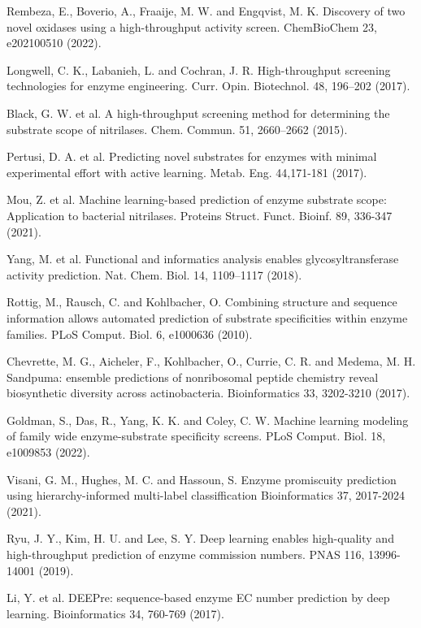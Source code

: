 \documentclass[12pt]{article}
\begin{document}
\begin{thebibliography}{99}
 Rembeza, E., Boverio, A., Fraaije, M. W. and Engqvist, M. K. Discovery of two novel oxidases using a high-throughput activity screen. ChemBioChem 23, e202100510 (2022).

 Longwell, C. K., Labanieh, L. and Cochran, J. R. High-throughput screening technologies for enzyme engineering. Curr. Opin. Biotechnol. 48, 196–202 (2017).

 Black, G. W. et al. A high-throughput screening method for determining the substrate scope of nitrilases. Chem. Commun. 51, 2660–2662 (2015).

 Pertusi, D. A. et al. Predicting novel substrates for enzymes with minimal experimental effort with active learning. Metab. Eng. 44,171-181 (2017).

 Mou, Z. et al. Machine learning-based prediction of enzyme substrate scope: Application to bacterial nitrilases. Proteins Struct. Funct. Bioinf. 89, 336-347 (2021).

 Yang, M. et al. Functional and informatics analysis enables glycosyltransferase activity prediction. Nat. Chem. Biol. 14, 1109–1117 (2018).

 Rottig, M., Rausch, C. and Kohlbacher, O. Combining structure and sequence information allows automated prediction of substrate specificities within enzyme families. PLoS Comput. Biol. 6, e1000636 (2010).

 Chevrette, M. G., Aicheler, F., Kohlbacher, O., Currie, C. R. and Medema, M. H. Sandpuma: ensemble predictions of nonribosomal peptide chemistry reveal biosynthetic diversity across actinobacteria. Bioinformatics 33, 3202-3210 (2017).

 Goldman, S., Das, R., Yang, K. K. and Coley, C. W. Machine learning modeling of family wide enzyme-substrate specificity screens. PLoS Comput. Biol. 18, e1009853 (2022).

 Visani, G. M., Hughes, M. C. and Hassoun, S. Enzyme promiscuity prediction using hierarchy-informed multi-label classiffication Bioinformatics 37, 2017-2024 (2021).

 Ryu, J. Y., Kim, H. U. and Lee, S. Y. Deep learning enables high-quality and high-throughput prediction of enzyme commission numbers. PNAS 116, 13996-14001 (2019).

 Li, Y. et al. DEEPre: sequence-based enzyme EC number prediction by deep learning. Bioinformatics 34, 760-769 (2017).


\end{thebibliography}
\end{document}
